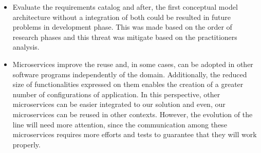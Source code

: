 \begin{itemize}
\item Evaluate the requirements catalog and after, the first conceptual model architecture without a integration of both could be resulted in future problems in development phase. This was made based on the order of research phases and this threat was mitigate based on the practitioners analysis.
\item Microservices improve the reuse and, in some cases, can be adopted in other software programs independently of the domain. Additionally, the reduced size of functionalities expressed on them enables the creation of a greater number of configurations of application. In this perspective, other microservices can be easier integrated to our solution and even, our microservices can be reused in other contexts. However, the evolution of the line will need more attention, since the communication among these microservices requires more efforts and tests to guarantee that they will work properly.



\end{itemize}



